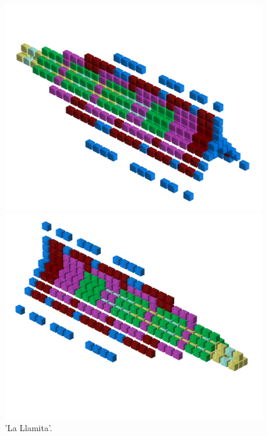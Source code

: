 \begin{figure}[H]
    \centering
    \begin{adjustbox}{width=12cm,center}
      \includegraphics[width=12cm]{src/patterns/pattern4-45.png}%
    \end{adjustbox}
    \begin{adjustbox}{width=12cm,margin=0cm -4cm}
      \includegraphics[width=12cm]{src/patterns/pattern4-225.png}%
    \end{adjustbox}
\caption{'La Llamita'.}
\end{figure}
\clearpage

